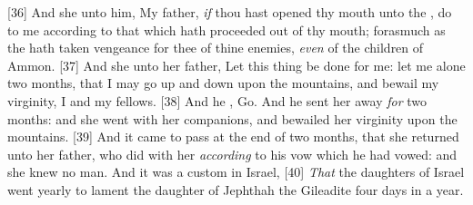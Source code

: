 [36] \textcolor[cmyk]{0.99998,1,0,0}{And she  unto him, My father, \emph{if} thou hast opened thy mouth unto the , do to me according to that which hath proceeded out of thy mouth; forasmuch as the  hath taken vengeance for thee of thine enemies, \emph{even} of the children of Ammon.}
[37] \textcolor[cmyk]{0.99998,1,0,0}{And she  unto her father, Let this thing be done for me: let me alone two months, that I may go up and down upon the mountains, and bewail my virginity, I and my fellows.}
[38] \textcolor[cmyk]{0.99998,1,0,0}{And he , Go. And he sent her away \emph{for} two months: and she went with her companions, and bewailed her virginity upon the mountains.}
[39] \textcolor[cmyk]{0.99998,1,0,0}{And it came to pass at the end of two months, that she returned unto her father, who did with her \emph{according} to his vow which he had vowed: and she knew no man. And it was a custom in Israel,}
[40] \textcolor[cmyk]{0.99998,1,0,0}{\emph{That} the daughters of Israel went yearly to lament the daughter of Jephthah the Gileadite four days in a year.}